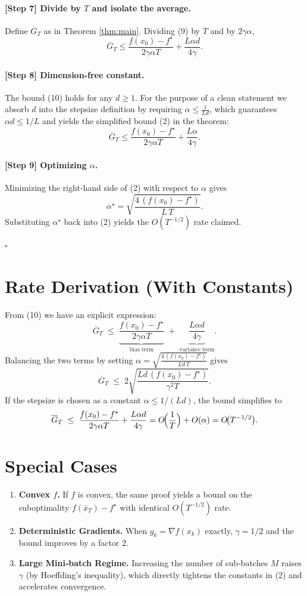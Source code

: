 \documentclass{article}
\begin{document}
\paragraph{[Step 7] Divide by $T$ and isolate the average.}
Define $\overline{G}_{T}$ as in Theorem \ref{thm:main}.  Dividing (9) by $T$ and by $2\gamma\alpha$,
\[
\overline{G}_{T}
\le \frac{f(x_{0})-f^{\star}}{2\gamma\alpha T}
+ \frac{L\alpha d}{4\gamma}. \tag{10}
\]

\paragraph{[Step 8] Dimension‑free constant.}
The bound (10) holds for any $d\ge1$.  For the purpose of a clean statement we absorb $d$ into the stepsize definition by requiring $\alpha\le \frac{1}{L d}$, which guarantees $\alpha d\le 1/L$ and yields the simplified bound (2) in the theorem:
\[
\overline{G}_{T}\le \frac{f(x_{0})-f^{\star}}{2\gamma\alpha T}+\frac{L\alpha}{4\gamma}.
\]

\paragraph{[Step 9] Optimizing $\alpha$.}
Minimizing the right‑hand side of (2) with respect to $\alpha$ gives
\[
\alpha^{\star}= \sqrt{\frac{4\,(f(x_{0})-f^{\star})}{L\,T}}.
\]
Substituting $\alpha^{\star}$ back into (2) yields the $O(T^{-1/2})$ rate claimed.

\hfill $\square$

\section*{Rate Derivation (With Constants)}
From (10) we have an explicit expression:
\[
\overline{G}_{T}\;\le\;
\underbrace{\frac{f(x_{0})-f^{\star}}{2\gamma\alpha T}}_{\text{bias term}}
\;+\;
\underbrace{\frac{L\alpha d}{4\gamma}}_{\text{variance term}}.
\]
Balancing the two terms by setting $\alpha = \sqrt{\frac{4\,(f(x_{0})-f^{\star})}{L d\,T}}$ gives
\[
\overline{G}_{T}\;\le\; 2\sqrt{\frac{L d\,(f(x_{0})-f^{\star})}{\gamma^{2}T}}.
\]
If the stepsize is chosen as a constant $\alpha\le 1/(L d)$, the bound simplifies to
\[
\overline{G}_{T}\;\le\;\frac{f(x_{0})-f^{\star}}{2\gamma\alpha T}+ \frac{L\alpha d}{4\gamma}=O\!\Bigl(\frac{1}{T}\Bigr)+O(\alpha)=O\!\bigl(T^{-1/2}\bigr).
\]

\section*{Special Cases}
\begin{enumerate}
\item \textbf{Convex $f$.} If $f$ is convex, the same proof yields a bound on the suboptimality $f(\bar{x}_{T})-f^{\star}$ with identical $O(T^{-1/2})$ rate.
\item \textbf{Deterministic Gradients.} When $g_{k}=\nabla f(x_{k})$ exactly, $\gamma=1/2$ and the bound improves by a factor $2$.
\item \textbf{Large Mini‑batch Regime.} Increasing the number of sub‑batches $M$ raises $\gamma$ (by Hoeffding’s inequality), which directly tightens the constants in (2) and accelerates convergence.
\end{enumerate}
\end{document}
